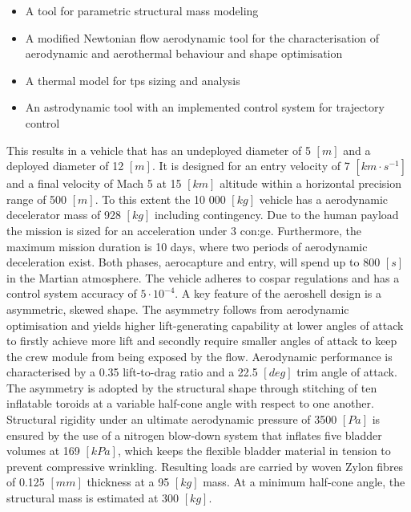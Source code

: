 \begin{itemize}
\item A tool for parametric structural mass modeling
\item A modified Newtonian flow aerodynamic tool for the characterisation of aerodynamic and aerothermal behaviour and shape optimisation
\item A thermal model for \acrfull{tps} sizing and analysis
\item An astrodynamic tool with an implemented control system for trajectory control
\end{itemize}
\vspace{1mm}
This results in a vehicle that has an undeployed diameter of 5 $ \left[ m \right] $ and a deployed diameter of 12 $ \left[ m \right] $. It is designed for an entry velocity of 7 $ \left[ km \cdot s^{-1} \right] $ and a final velocity of Mach 5 at  15 $ \left[ km \right] $ altitude within a horizontal precision range of 500 $ \left[ m \right] $. To this extent the 10 000 $ \left[ kg \right] $ vehicle has a aerodynamic decelerator mass of 928 $ \left[ kg \right] $ including contingency. Due to the human payload the mission is sized for an acceleration under 3 \gls{con:ge}. Furthermore, the maximum mission duration is 10 days, where two periods of aerodynamic deceleration exist. Both phases, aerocapture and entry, will spend up to 800 $ \left[ s \right] $ in the Martian atmosphere. The vehicle adheres to \acrshort{cospar} regulations and has a control system accuracy of $ 5 \cdot 10^{-4} $.
\newline
\newline
A key feature of the aeroshell design is a asymmetric, skewed shape. The asymmetry follows from aerodynamic optimisation and yields higher lift-generating capability at lower angles of attack to firstly achieve more lift and secondly require smaller angles of attack to keep the crew module from being exposed by the flow. Aerodynamic performance is characterised by a 0.35 lift-to-drag ratio and a 22.5 $\left[deg\right]$ trim angle of attack.
\newline
\newline
The asymmetry is adopted by the structural shape through stitching of ten inflatable toroids at a variable half-cone angle with respect to one another. Structural rigidity under an ultimate aerodynamic pressure of 3500 $\left[Pa\right]$ is ensured by the use of a nitrogen blow-down system that inflates five bladder volumes at 169 $\left[kPa\right]$, which keeps the flexible bladder material in tension to prevent compressive wrinkling. Resulting loads are carried by woven Zylon fibres of 0.125 $\left[mm\right]$ thickness at a 95 $\left[kg\right]$ mass. At a minimum half-cone angle, the structural mass is estimated at 300 $\left[kg\right]$. 
